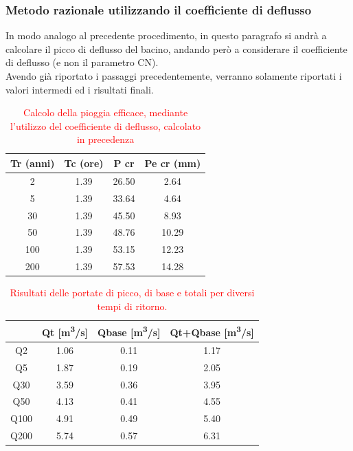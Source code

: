 \subsubsection{Metodo razionale utilizzando il coefficiente di deflusso}
In modo analogo al precedente procedimento, in questo paragrafo si andrà a calcolare il picco di deflusso del bacino, andando però a considerare il coefficiente di deflusso (e non il parametro CN).\\
Avendo già riportato i passaggi precedentemente, verranno solamente riportati i valori intermedi ed i risultati finali.
\begin{table}[H] \centering
    \caption{\textcolor{red}{Calcolo della pioggia efficace, mediante l'utilizzo del coefficiente di deflusso, calcolato in precedenza}}
    \begin{tabular}{cccc}
        \toprule
        Tr (anni)        & Tc (ore) & P cr  & Pe cr (mm) \\
        \midrule
    2   & 1.39     & 26.50 & 2.64       \\
    5    & 1.39     & 33.64 & 4.64       \\
    30   & 1.39     & 45.50 & 8.93       \\
    50   & 1.39     & 48.76 & 10.29      \\
    100 & 1.39     & 53.15 & 12.23      \\
    200 & 1.39     & 57.53 & 14.28      \\
    \bottomrule
    \end{tabular}
    \end{table}

\begin{table}[H] \centering
        \caption{\textcolor{red}{Risultati delle portate di picco, di base e totali per diversi tempi di ritorno.}}
        \begin{tabular}{cccc}
            \toprule
        & \multicolumn{1}{c}{Qt [\unit{m^3/s}]} & \multicolumn{1}{c}{Qbase [\unit{m^3/s}]} & \multicolumn{1}{c}{Qt+Qbase [\unit{m^3/s}]} \\
        \midrule
        Q2   & 1.06    & 0.11   & 1.17         \\
        Q5   & 1.87  & 0.19  & 2.05  \\
        Q30  & 3.59     & 0.36 & 3.95        \\
        Q50  & 4.13  & 0.41   & 4.55  \\
        Q100 & 4.91  & 0.49    & 5.40     \\
        Q200 & 5.74 & 0.57 & 6.31    \\
        \bottomrule    
        \end{tabular}
\end{table}

